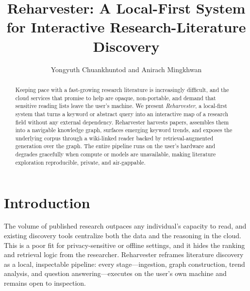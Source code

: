 \documentclass[11pt]{article}
\title{\vspace{-1.5em}Reharvester: A Local-First System for Interactive
Research-Literature Discovery}
\author{Yongyuth Chuankhuntod and Anirach Mingkhwan}
\date{}
\begin{document}
\maketitle
\vspace{-2em}

\begin{abstract}
\noindent
Keeping pace with a fast-growing research literature is increasingly difficult, and
the cloud services that promise to help are opaque, non-portable, and demand that
sensitive reading lists leave the user's machine. We present \emph{Reharvester}, a
local-first system that turns a keyword or abstract query into an interactive map of a
research field without any external dependency. Reharvester harvests papers, assembles
them into a navigable knowledge graph, surfaces emerging keyword trends, and exposes the
underlying corpus through a wiki-linked reader backed by retrieval-augmented generation
over the graph. The entire pipeline runs on the user's hardware and degrades gracefully
when compute or models are unavailable, making literature exploration reproducible,
private, and air-gappable.
\end{abstract}

\section{Introduction}
The volume of published research outpaces any individual's capacity to read, and
existing discovery tools centralize both the data and the reasoning in the cloud. This
is a poor fit for privacy-sensitive or offline settings, and it hides the ranking and
retrieval logic from the researcher. Reharvester reframes literature discovery as a
local, inspectable pipeline: every stage---ingestion, graph construction, trend
analysis, and question answering---executes on the user's own machine and remains open
to inspection.
\end{document}
